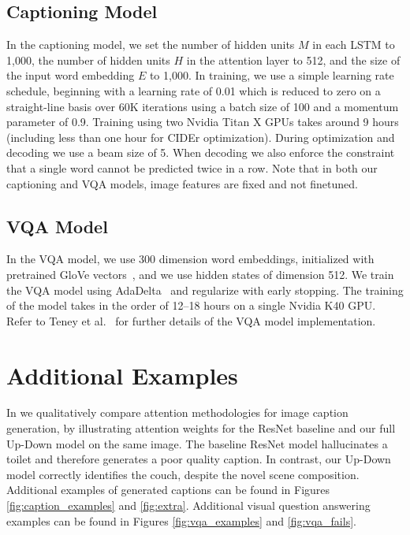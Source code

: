 \documentclass[10pt,twocolumn,letterpaper]{article}
\begin{document}
\subsection{Captioning Model}

In the captioning model, we set the number of hidden units $M$ in each LSTM to 1,000, the number of hidden units $H$ in the attention layer to 512, and the size of the input word embedding $E$ to 1,000. In training, we use  a simple learning rate schedule, beginning with a learning rate of 0.01 which is reduced to zero on a straight-line basis over 60K iterations using a batch size of 100 and a momentum parameter of 0.9. Training using two Nvidia Titan X GPUs takes around 9 hours (including less than one hour for CIDEr optimization). During optimization and decoding we use a beam size of 5. When decoding we also enforce the constraint that a single word cannot be predicted twice in a row. Note that in both our captioning and VQA models, image features are fixed and not finetuned. 

\subsection{VQA Model}

In the VQA model, we use 300 dimension word embeddings, initialized with pretrained GloVe vectors~\cite{pennington2014glove}, and we use hidden states of dimension 512. We train the VQA model using AdaDelta~\cite{zeiler2012adadelta} and regularize with early stopping. The training of the model takes in the order of 12--18 hours on a single Nvidia K40 GPU. Refer to Teney et al.~\cite{teney2017tips} for further details of the VQA model implementation.


\section{Additional Examples}

In  we qualitatively compare attention methodologies for image caption generation, by illustrating attention weights for the ResNet baseline and our full Up-Down model on the same image. The baseline ResNet model hallucinates a toilet and therefore generates a poor quality caption. In contrast, our Up-Down model correctly identifies the couch, despite the novel scene composition. Additional examples of generated captions can be found in Figures \ref{fig:caption_examples} and \ref{fig:extra}. Additional visual question answering examples can be found in Figures \ref{fig:vqa_examples} and \ref{fig:vqa_fails}.
\end{document}
